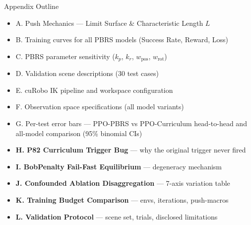 \documentclass[aspectratio=169,xcolor=dvipsnames,t]{beamer}
\begin{document}

\makefinalpage


\appendix
\begin{frame}[t]{Appendix Outline}
  \begin{itemize}
    \item A. Push Mechanics — Limit Surface \& Characteristic Length $L$
    \item B. Training curves for all PBRS models (Success Rate, Reward, Loss)
    \item C. PBRS parameter sensitivity ($k_p$, $k_r$, $w_{\text{pos}}$, $w_{\text{rot}}$)
    \item D. Validation scene descriptions (30 test cases)
    \item E. cuRobo IK pipeline and workspace configuration
    \item F. Observation space specifications (all model variants)
    \item G. Per-test error bars — PPO-PBRS vs PPO-Curriculum head-to-head and all-model comparison (95\% binomial CIs)
    \item \textbf{H. P82 Curriculum Trigger Bug} — why the original trigger never fired
    \item \textbf{I. BobPenalty Fail-Fast Equilibrium} — degeneracy mechanism
    \item \textbf{J. Confounded Ablation Disaggregation} — 7-axis variation table
    \item \textbf{K. Training Budget Comparison} — envs, iterations, push-macros
    \item \textbf{L. Validation Protocol} — scene set, trials, disclosed limitations
  \end{itemize}
\end{frame}
\end{document}
